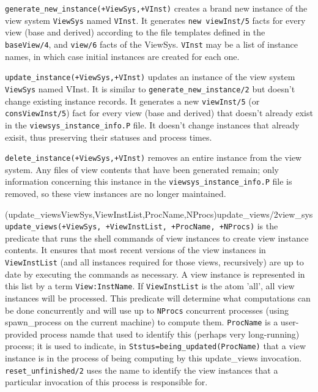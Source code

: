 \begin{description}

%
{\tt generate\_new\_instance(+ViewSys,+VInst)} creates a brand new
instance of the view system {\tt ViewSys} named {\tt VInst}.  It
generates {\tt new\ viewInst/5} facts for every view (base and
derived) according to the file templates defined in the {\tt
  baseView/4}, and {\tt view/6} facts of the ViewSys.  {\tt VInst} may
be a list of instance names, in which case initial instances are
created for each one.

{\tt update\_instance(+ViewSys,+VInst)} updates an instance of the
view system {\tt ViewSys} named VInst.  It is similar to
{\tt generate\_new\_instance/2} but doesn't change existing instance
records.  It generates a new {\tt viewInst/5} (or
{\tt consViewInst/5}) fact for every view (base and derived) that
doesn't already exist in the {\tt viewsys\_instance\_info.P} file.  It
doesn't change instances that already exisit, thus preserving their
statuses and process times.  

%
{\tt delete\_instance(+ViewSys,+VInst)} removes an entire instance
from the view system.  Any files of view contents that have been
generated remain; only information concerning this instance in the
{\tt viewsys\_instance\_info.P} file is removed, so these view
instances are no longer maintained.

\ourmoditem(update\_views{ViewSys,ViewInstList,ProcName,NProcs)}{update\_views/2}{view\_sys}
{\tt update\_views(+ViewSys, +ViewInstList, +ProcName, +NProcs)} is
the predicate that runs the shell commands of view instances to create
view instance contents.  It ensures that most recent versions of the
view instances in {\tt ViewInstList} (and all instances required for those
views, recursively) are up to date by executing the commands as
necessary.  A view instance is represented in this list by a term
{\tt View:InstName}.  If {\tt ViewInstList} is the atom 'all', all
view instances will be processed.  This predicate will determine what
computations can be done concurrently and will use up to {\tt NProcs}
concurrent processes (using spawn\_process on the current machine) to
compute them.  {\tt ProcName} is a user-provided process namde that
used to identify this (perhaps very long-running) process; it is used
to indicate, in {\tt Ststus=being\_updated(ProcName)} that a view
instance is in the process of being computing by this update\_views
invocation.  {\tt reset\_unfinished/2} uses the name to identify the
view instances that a particular invocation of this process is
responsible for.  


\end{description}
